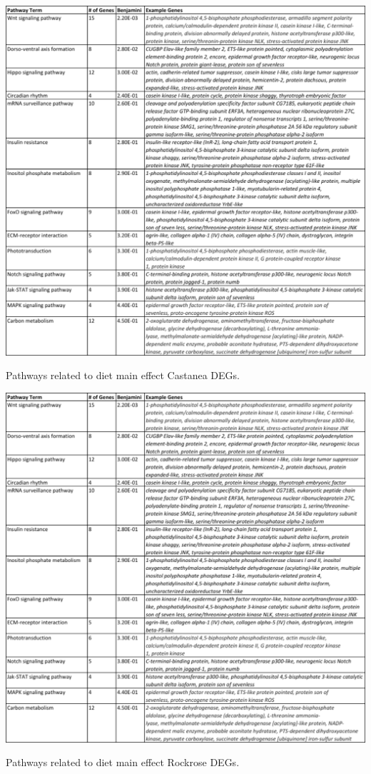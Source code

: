 \documentclass[11pt,a4paper,oldfontcommands,openany]{memoir}
\numberwithin{equation}{section} %
\begin{document}
\begin{table}[H]
  \includegraphics[width=\textwidth]{Images/CastaneaPathways}
  \caption{Pathways related to diet main effect Castanea DEGs.}
  \label{tbl:CastaneaPathways}
\end{table}

\begin{table}[H]
  \includegraphics[width=\textwidth]{Images/CastaneaPathways}
  \caption{Pathways related to diet main effect Rockrose DEGs.}
  \label{tbl:RockrosePathways}
\end{table}
\end{document}
